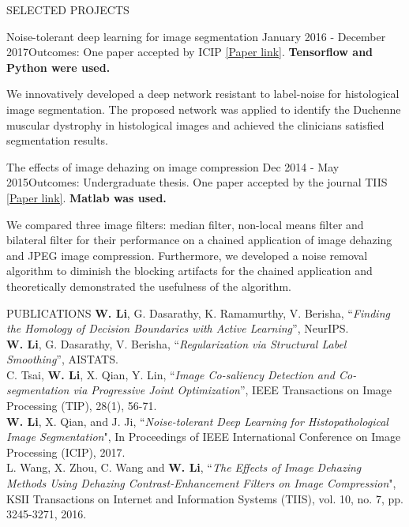 \documentclass{resume} %
\begin{document}
\begin{rSection}{SELECTED PROJECTS}
\begin{rSubsection}{Noise-tolerant deep learning for image segmentation} {January 2016 - December 2017}{Outcomes: One paper accepted by ICIP \href{https://ieeexplore.ieee.org/stamp/stamp.jsp?tp=&arnumber=8296848}{[Paper link]}. \textbf{Tensorflow and Python were used.}}{}
\item We innovatively developed a deep network resistant to label-noise for histological image segmentation. The proposed network was applied to identify the Duchenne muscular dystrophy in histological images and achieved the clinicians satisfied segmentation results.
\end{rSubsection}  
\vspace{-0.1cm}
\begin{rSubsection}{The effects of image dehazing on image compression} {Dec 2014 - May 2015}{Outcomes: Undergraduate thesis. One paper accepted by the journal TIIS \href{http://www.itiis.org/digital-library/manuscript/1403}{[Paper link]}. \textbf{Matlab was used.}}{}
\item  We compared three image filters: median filter,  non-local means filter and bilateral filter for their performance on a chained application of image dehazing and JPEG image compression. Furthermore, we developed a noise removal algorithm to diminish the blocking artifacts for the chained application and theoretically demonstrated the usefulness of the algorithm.
\end{rSubsection}  
\vspace{-0.1cm}
\end{rSection} 
\vspace{-0.1cm}
\newpage
\begin{rSection}{PUBLICATIONS} \itemsep -3pt  
 \textbf{W. Li}, G. Dasarathy, K. Ramamurthy, V. Berisha, ``\textit{Finding the Homology of Decision Boundaries with Active Learning}'',  NeurIPS. \vspace{+5pt}\\
 \textbf{W. Li}, G. Dasarathy, V. Berisha, ``\textit{Regularization via Structural Label Smoothing}'',  AISTATS. \vspace{+5pt}\\
C. Tsai, \textbf{W. Li}, X. Qian, Y. Lin, ``\textit{Image Co-saliency Detection and Co-segmentation via Progressive Joint Optimization}'', IEEE Transactions on Image Processing ({TIP}), 28(1), 56-71. \vspace{+5pt}\\
\textbf{W. Li}, X. Qian, and J. Ji, ``\textit{Noise-tolerant Deep Learning for Histopathological Image Segmentation}", In Proceedings of IEEE International Conference on Image Processing ({ICIP}), 2017. \vspace{+5pt}\\
L. Wang, X. Zhou, C. Wang and \textbf{W. Li}, ``\textit{The Effects of Image Dehazing Methods Using Dehazing Contrast-Enhancement Filters on Image Compression}", KSII Transactions on Internet and Information Systems ({TIIS}), vol. 10, no. 7, pp. 3245-3271, 2016. 
\end{rSection}  
\end{document}
